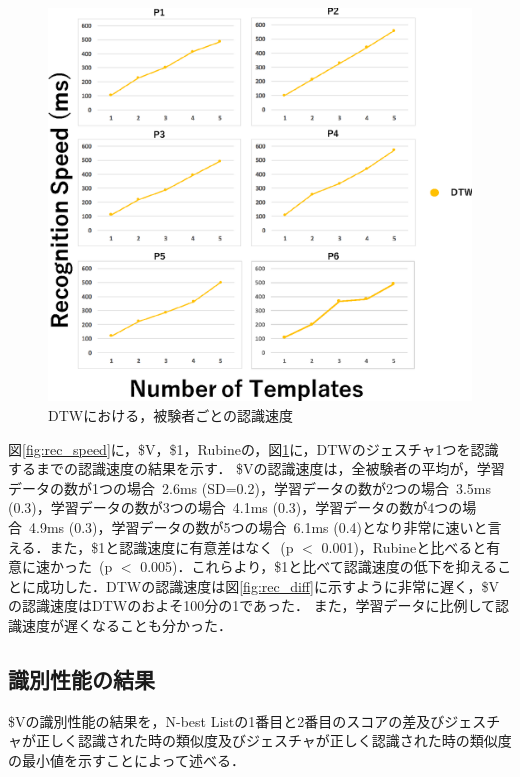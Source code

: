 \begin{figure}[!h]
\centering
\includegraphics[width=1.0\columnwidth]{img/rec_speed_dtw.eps}
\caption{DTWにおける，被験者ごとの認識速度}
\label{fig:rec_speed_dtw}
\end{figure}

図\ref{fig:rec_speed}に，\$V，\$1，Rubineの，図\ref{fig:rec_speed_dtw}に，DTWのジェスチャ1つを認識するまでの認識速度の結果を示す．
\$Vの認識速度は，全被験者の平均が，学習データの数が1つの場合~2.6ms (SD=0.2)，学習データの数が2つの場合~3.5ms (0.3)，学習データの数が3つの場合~4.1ms (0.3)，学習データの数が4つの場合~4.9ms (0.3)，学習データの数が5つの場合~6.1ms (0.4)となり非常に速いと言える．また，\$1と認識速度に有意差はなく~(p $<$ 0.001)，Rubineと比べると有意に速かった~(p $<$ 0.005)．これらより，\$1と比べて認識速度の低下を抑えることに成功した．DTWの認識速度は図\ref{fig:rec_diff}に示すように非常に遅く，\$Vの認識速度はDTWのおよそ100分の1であった．
また，学習データに比例して認識速度が遅くなることも分かった．

\clearpage
\subsection{識別性能の結果}
\$Vの識別性能の結果を，N-best Listの1番目と2番目のスコアの差及びジェスチャが正しく認識された時の類似度及びジェスチャが正しく認識された時の類似度の最小値を示すことによって述べる．

